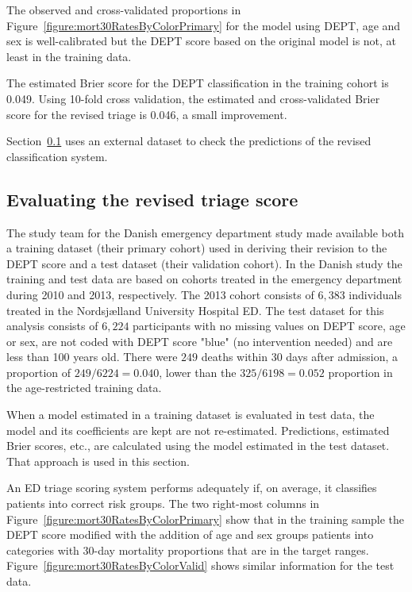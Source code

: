  The observed and cross-validated proportions in Figure~\ref{figure:mort30RatesByColorPrimary} for the model using DEPT, age and sex is well-calibrated but the DEPT score based on the original model is not, at least in the training data.

The estimated Brier score for the DEPT classification in the training cohort is 0.049. Using 10-fold cross validation, the estimated and cross-validated Brier score for the revised triage is 0.046, a small improvement.

Section~\ref{section:validationRevisedTriageScore} uses an external dataset to check the predictions of the revised classification system.


\subsection{Evaluating the revised triage score}
\label{section:validationRevisedTriageScore}

The study team for the Danish emergency department study made available both a training dataset (their primary cohort) used in deriving their revision to the DEPT score and a test dataset (their validation cohort).  In the Danish study the training and test data are based on cohorts treated in the emergency department during 2010 and 2013, respectively.  The 2013 cohort consists of $6,383$ individuals treated in the Nordsj{\ae}lland University Hospital ED.  The test dataset for this analysis consists of $6,224$ participants with no missing values on DEPT score, age or sex, are not coded with DEPT score "blue" (no intervention needed) and are less than 100 years old.   There were $249$ deaths within 30 days after admission, a proportion of $249/6224 = 0.040$, lower than the $325/6198 = 0.052$ proportion in the age-restricted training data. 

When a model estimated in a training dataset is evaluated in test data, the model and its coefficients are kept are not re-estimated.  Predictions, estimated Brier scores, etc., are  calculated using the model estimated in the test dataset.  That approach is used in this section.

An ED triage scoring system performs adequately if, on average, it classifies patients into correct risk groups.  The two right-most columns in Figure~\ref{figure:mort30RatesByColorPrimary}  show that in the training sample the DEPT score modified with the addition of age and sex groups patients into categories with 30-day mortality proportions that are in the target ranges.  Figure~\ref{figure:mort30RatesByColorValid} shows similar information for the test data.

